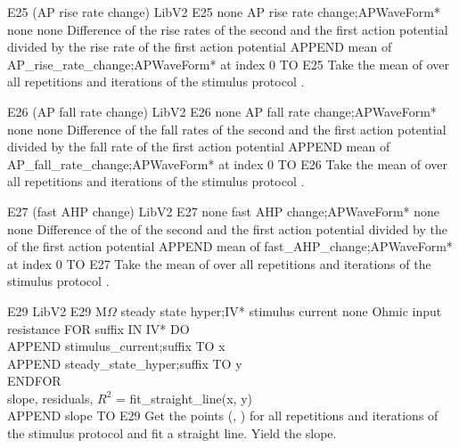 \begin{efeature}
  {E25 (AP rise rate change)}
  {LibV2}
  {E25}
  {none}
  {AP rise rate change;APWaveForm*}
  {none}
  {none}
  {Difference of the rise rates of the second and the first action potential divided by the rise rate of the first action potential}
  {
  APPEND mean of AP\_rise\_rate\_change;APWaveForm* at index 0 TO E25
  }
  Take the mean of  over all repetitions and iterations of the stimulus protocol .
  
\end{efeature}

\begin{efeature}
  {E26 (AP fall rate change)}
  {LibV2}
  {E26}
  {none}
  {AP fall rate change;APWaveForm*}
  {none}
  {none}
  {Difference of the fall rates of the second and the first action potential divided by the fall rate of the first action potential}
  {
  APPEND mean of AP\_fall\_rate\_change;APWaveForm* at index 0 TO E26
  }
  Take the mean of  over all repetitions and iterations of the stimulus protocol .
  
\end{efeature}

\begin{efeature}
  {E27 (fast AHP change)}
  {LibV2}
  {E27}
  {none}
  {fast AHP change;APWaveForm*}
  {none}
  {none}
  {Difference of the  of the second and the first action potential divided by the  of the first action potential}
  {
  APPEND mean of fast\_AHP\_change;APWaveForm* at index 0 TO E27
  }
  Take the mean of  over all repetitions and iterations of the stimulus protocol .
  
\end{efeature}

\begin{efeature}
  {E29}
  {LibV2}
  {E29}
  {M$\Omega$}
  {steady state hyper;IV*}
  {stimulus current}
  {none}
  {Ohmic input resistance}
  {
  FOR suffix IN IV* DO \+ \\
    APPEND stimulus\_current;suffix TO x \\
    APPEND steady\_state\_hyper;suffix TO y \- \\
  ENDFOR \\
  slope, residuals, $R^2$ = fit\_straight\_line(x, y) \\
  APPEND slope TO E29
  }
  Get the points (, ) for all repetitions and iterations of the stimulus protocol  and fit a straight line.
  Yield the slope.
  
\end{efeature}

